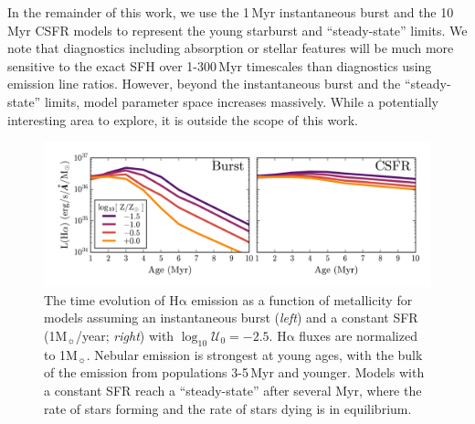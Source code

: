 \documentclass[preprint2,trackchanges]{aastex62}
\newcommand\Msun{\ensuremath{\mathrm{M_{\sun}}}\xspace}
\newcommand{\ha}{\ensuremath{\mathrm{H\alpha}}\xspace}
\newcommand{\Myr}{$\,$Myr\xspace}
\newcommand{\logten}{\ensuremath{\log_{10}}}
\newcommand{\logUeq}[1]{\ensuremath{\logten \mathcal{U}_0 = #1}}
\begin{document}
In the remainder of this work, we use the 1\Myr instantaneous burst and the 10\Myr CSFR models to represent the young starburst and ``steady-state'' limits. We note that diagnostics including absorption or stellar features will be much more sensitive to the exact SFH over 1-300\Myr timescales than diagnostics using emission line ratios. However, beyond the instantaneous burst and the “steady-state” limits, model parameter space increases massively. While a potentially interesting area to explore, it is outside the scope of this work.

\begin{figure}
  \begin{center}
    \includegraphics[width=\linewidth]{figs/f5.png}
    \caption{The time evolution of \ha emission as a function of metallicity for models assuming an instantaneous burst (\emph{left}) and a constant SFR (1\Msun/year; \emph{right}) with \logUeq{-2.5}. \ha fluxes are normalized to 1\Msun. Nebular emission is strongest at young ages, with the bulk of the emission from populations 3-5\Myr and younger. Models with a constant SFR reach a ``steady-state'' after several Myr, where the rate of stars forming and the rate of stars dying is in equilibrium.}
    \label{fig:EmTimeEvol}
  \end{center}
\end{figure}
\end{document}
